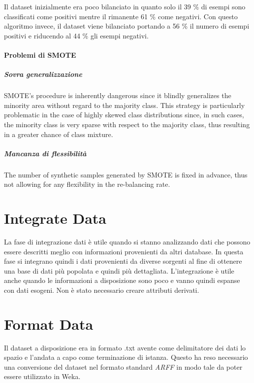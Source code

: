 Il dataset inizialmente era poco bilanciato in quanto solo il 39 \% di esempi sono classificati come positivi mentre il rimanente 61 \% come negativi. Con questo algoritmo invece, il dataset viene bilanciato portando a 56 \% il numero di esempi positivi e riducendo al 44 \% gli esempi negativi.
\paragraph*{Problemi di SMOTE}
\subparagraph*{Sovra generalizzazione}
SMOTE’s procedure is inherently dangerous since it blindly generalizes the minority area without regard to the majority class.
This strategy is particularly problematic in the case of highly skewed class distributions since, in such cases, the minority class is very sparse with respect to the majority class, thus resulting in a greater chance of class mixture.


\subparagraph*{Mancanza di flessibilità}
The number of synthetic samples generated by SMOTE is fixed in advance, thus not allowing for any flexibility in the re-balancing rate.


\section{Integrate Data}
La fase di integrazione dati è utile quando si stanno analizzando dati che possono essere descritti meglio con informazioni provenienti da altri database. In questa fase si integrano quindi i dati provenienti da diverse sorgenti al fine di ottenere una base di dati più popolata e quindi più dettagliata. L'integrazione è utile anche quando le informazioni a disposizione sono poco e vanno quindi espanse con dati esogeni.
Non è stato necessario creare attributi derivati.

\section{Format Data}
Il dataset a disposizione era in formato .txt avente come delimitatore dei dati lo spazio e l'andata a capo come terminazione di istanza. Questo ha reso necessario una conversione del dataset nel formato standard \textit{ARFF} in modo tale da poter essere utilizzato in Weka.
